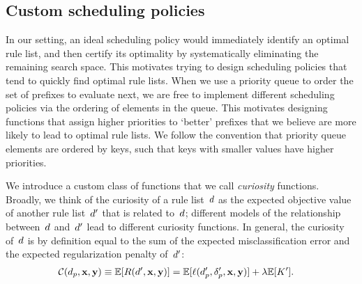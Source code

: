 \subsection{Custom scheduling policies}
\label{sec:scheduling}

In our setting, an ideal scheduling policy would immediately identify an optimal
rule list, and then certify its optimality by systematically eliminating the
remaining search space.
%
This motivates trying to design scheduling policies that tend to quickly find optimal rule lists.
%
When we use a priority queue to order the set of prefixes to evaluate next,
we are free to implement different scheduling policies via the ordering of
elements in the queue.
%
This motivates designing functions that assign higher priorities to `better'
prefixes that we believe are more likely to lead to optimal rule lists.
%
We follow the convention that priority queue elements are ordered
by keys, such that keys with smaller values have higher priorities.

We introduce a custom class of functions that we call \emph{curiosity} functions.
%
Broadly, we think of the curiosity of a rule list~${d}$
as the expected objective value of another rule list~${d}'$ that is related to~${d}$;
different models of the relationship between~${d}$ and~${d}'$ lead to different
curiosity functions.
%
In general, the curiosity of~${d}$ is by definition equal to the sum of the expected
misclassification error and the expected regularization penalty of~${d}'$:
\begin{align}
\mathcal{C}(d_p, \mathbf{x}, \mathbf{y}) \equiv \mathbb{E}[ R({d}', \mathbf{x}, \mathbf{y}) ]
&= \mathbb{E}[\ell(d_p', \delta_p', \mathbf{x}, \mathbf{y})] + {\lambda} \mathbb{E}[ K' ].
\label{eq:curiosity}
\end{align}

